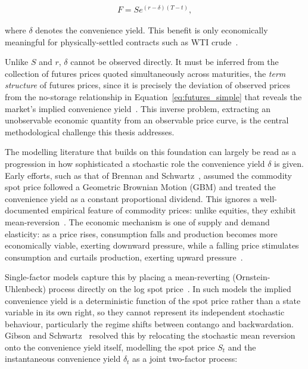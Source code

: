 \documentclass[11pt, a4paper]{article}
\begin{document}
\begin{align} \label{eq:futures_convenience}
F = Se^{(r-\delta)(T-t)},
\end{align}

where $\delta$ denotes the convenience yield. This benefit is only economically meaningful for physically-settled contracts such as WTI crude~\cite{Hull2022OptionsDerivatives}.

Unlike $S$ and $r$, $\delta$ cannot be observed directly. It must be inferred from the collection of futures prices quoted simultaneously across maturities, the \textit{term structure} of futures prices, since it is precisely the deviation of observed prices from the no-storage relationship in Equation~\ref{eq:futures_simple} that reveals the market's implied convenience yield~\cite{Liu2009No-ArbitrageStructures}. This inverse problem, extracting an unobservable economic quantity from an observable price curve, is the central methodological challenge this thesis addresses.

\label{sec:lit_commodity}

The modelling literature that builds on this foundation can largely be read as a progression in how sophisticated a stochastic role the convenience yield $\delta$ is given. Early efforts, such as that of Brennan and Schwartz~\cite{Brennan1985EvaluatingInvestments}, assumed the commodity spot price followed a Geometric Brownian Motion (GBM) and treated the convenience yield as a constant proportional dividend. This ignores a well-documented empirical feature of commodity prices: unlike equities, they exhibit mean-reversion~\cite{Hull2022OptionsDerivatives, Gibson1990StochasticClaims}. The economic mechanism is one of supply and demand elasticity: as a price rises, consumption falls and production becomes more economically viable, exerting downward pressure, while a falling price stimulates consumption and curtails production, exerting upward pressure~\cite{Hull2022OptionsDerivatives}.

Single-factor models capture this by placing a mean-reverting (Ornstein-Uhlenbeck) process directly on the log spot price~\cite{Hull2022OptionsDerivatives, Schwartz1997TheHedging}. In such models the implied convenience yield is a deterministic function of the spot price rather than a state variable in its own right, so they cannot represent its independent stochastic behaviour, particularly the regime shifts between contango and backwardation. Gibson and Schwartz~\cite{Gibson1990StochasticClaims} resolved this by relocating the stochastic mean reversion onto the convenience yield itself, modelling the spot price $S_t$ and the instantaneous convenience yield $\delta_t$ as a joint two-factor process:
\end{document}
